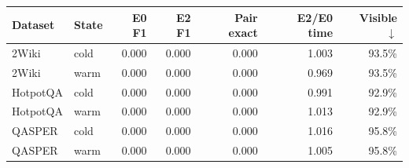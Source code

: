 \begin{tabular}{llrrrrr}
\toprule
Dataset & State & E0 F1 & E2 F1 & Pair exact & E2/E0 time & Visible $\downarrow$ \\
\midrule
2Wiki & cold & 0.000 & 0.000 & 0.000 & 1.003 & 93.5\% \\
2Wiki & warm & 0.000 & 0.000 & 0.000 & 0.969 & 93.5\% \\
HotpotQA & cold & 0.000 & 0.000 & 0.000 & 0.991 & 92.9\% \\
HotpotQA & warm & 0.000 & 0.000 & 0.000 & 1.013 & 92.9\% \\
QASPER & cold & 0.000 & 0.000 & 0.000 & 1.016 & 95.8\% \\
QASPER & warm & 0.000 & 0.000 & 0.000 & 1.005 & 95.8\% \\
\bottomrule
\end{tabular}

